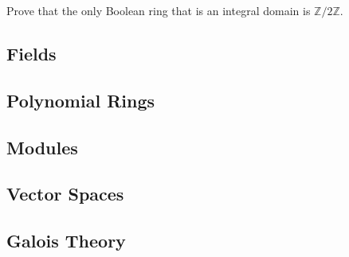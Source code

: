   \begin{exercise}[Dummit 7.1.16]
    Prove that the only Boolean ring that is an integral domain is $\mathbb{Z}/2\mathbb{Z}$. 
  \end{exercise}
  \begin{solution}
    
  \end{solution}

\subsection{Fields}

\subsection{Polynomial Rings}

\subsection{Modules}

\subsection{Vector Spaces}

\subsection{Galois Theory}

